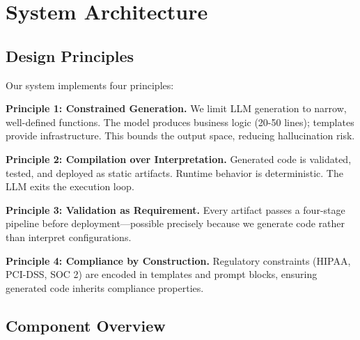 \documentclass[11pt]{article}
\begin{document}
\section{System Architecture}
\label{sec:architecture}

\subsection{Design Principles}

Our system implements four principles:

\textbf{Principle 1: Constrained Generation.} We limit LLM generation to narrow, well-defined functions. The model produces business logic (20-50 lines); templates provide infrastructure. This bounds the output space, reducing hallucination risk.

\textbf{Principle 2: Compilation over Interpretation.} Generated code is validated, tested, and deployed as static artifacts. Runtime behavior is deterministic. The LLM exits the execution loop.

\textbf{Principle 3: Validation as Requirement.} Every artifact passes a four-stage pipeline before deployment---possible precisely because we generate code rather than interpret configurations.

\textbf{Principle 4: Compliance by Construction.} Regulatory constraints (HIPAA, PCI-DSS, SOC 2) are encoded in templates and prompt blocks, ensuring generated code inherits compliance properties.

\subsection{Component Overview}
\end{document}
